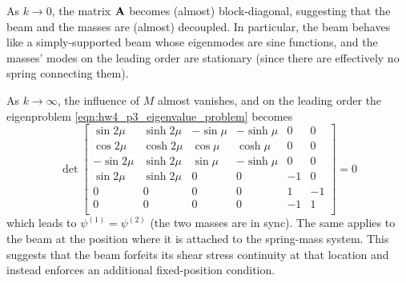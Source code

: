 As $k \rightarrow 0$, the matrix $\mathbf{A}$ becomes (almost) block-diagonal, suggesting that the beam and the masses are (almost) decoupled.
In particular, the beam behaves like a simply-supported beam whose eigenmodes are sine functions, and the masses' modes on the leading order are stationary (since there are effectively no spring connecting them). 

As $k \rightarrow \infty$, the influence of $M$ almost vanishes, and on the leading order the eigenproblem \cref{eqn:hw4_p3_eigenvalue_problem} becomes 
\begin{equation}
    \det \begin{bmatrix}
        \sin 2\mu & \sinh 2\mu & -\sin \mu & -\sinh \mu & 0 & 0 \\
        \cos 2\mu & \cosh 2\mu & \cos \mu & \cosh \mu & 0 & 0 \\
        -\sin 2\mu & \sinh 2\mu & \sin \mu & -\sinh \mu & 0 & 0 \\
        \sin 2\mu & \sinh 2\mu & 0 & 0 & -1 & 0 \\
        0 & 0 & 0 & 0 & 1 & -1 \\
        0 & 0 & 0 & 0 & -1 & 1 \\
    \end{bmatrix} = 0
\end{equation}
which leads to $\psi^{(1)} = \psi^{(2)}$ (the two masses are in sync). 
The same applies to the beam at the position where it is attached to the spring-mass system. 
This suggests that the beam forfeits its shear stress continuity at that location and instead enforces an additional fixed-position condition. 

